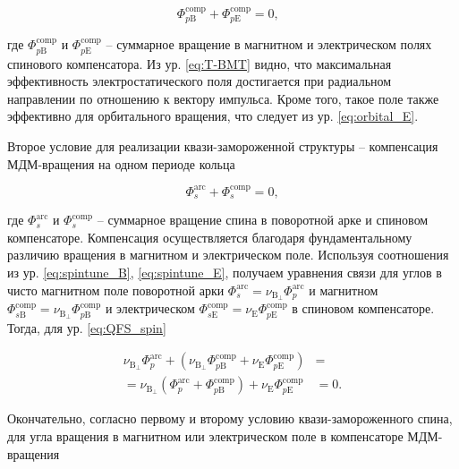 \begin{equation}
	\Phi_{p\textrm{B}}^{\textrm{comp}}+{\Phi}_{p\textrm{E}}^{\textrm{comp}} = 0,\ \ \
	\label{eq:spin_comp}
\end{equation}

\noindent где $\Phi_{p\textrm{B}}^{\textrm{comp}}$ и ${\Phi}_{p\textrm{E}}^{\textrm{comp}}$ -- суммарное вращение в магнитном и электрическом полях спинового компенсатора. Из ур. \ref{eq:T-BMT} видно, что максимальная эффективность электростатического поля достигается при радиальном направлении по отношению к вектору импульса. Кроме того, такое поле также эффективно для орбитального вращения, что следует из ур. \ref{eq:orbital_E}.

Второе условие для реализации квази-замороженной структуры -- компенсация МДМ-вращения на одном периоде кольца

\begin{equation}
	\Phi_s^{\textrm{arc}}+\Phi_{s}^{\textrm{comp}}=0,
	\label{eq:QFS_spin}
\end{equation}

\noindent где $\Phi_s^{\textrm{arc}}$ и $\Phi_{s}^{\textrm{comp}}$ -- суммарное вращение спина в поворотной арке и спиновом компенсаторе. Компенсация осуществляется благодаря фундаментальному различию вращения в магнитном и электрическом поле. Используя соотношения из ур. \ref{eq:spintune_B}, \ref{eq:spintune_E}, получаем уравнения связи для углов в чисто магнитном поле поворотной арки  $\Phi_{s}^{\text{arc}} = \nu_{\mathrm{B}_{\perp}}\Phi_{p}^{\text{arc}}$ и магнитном $\Phi_{s\mathrm{B}}^{\text{comp}} = \nu_{\mathrm{B}_{\perp}}\Phi_{p\mathrm{B}}^{\text{comp}}$ и электрическом $\Phi_{s\mathrm{E}}^{\text{comp}} = \nu_{\mathrm{E}}\Phi_{p\mathrm{E}}^{\text{comp}}$ в спиновом компенсаторе. Тогда, для ур. \ref{eq:QFS_spin}

 \begin{equation}
	\begin{aligned}
		\nu_{\mathrm{B}_{\perp}}\Phi_{p}^{\text{arc}} +
		\left(\nu_{\mathrm{B}_{\perp}}\Phi_{p\mathrm{B}}^{\text{comp}} +
		\nu_{\mathrm{E}}\Phi_{p\mathrm{E}}^{\text{comp}} \right) & = \\
		= \nu_{\mathrm{B}_{\perp}} \left( 
		\Phi_{p}^{\text{arc}} +
		\Phi_{p\mathrm{B}}^{\text{comp}} \right) +
		\nu_{\mathrm{E}}\Phi_{p\mathrm{E}}^{\text{comp}}  & = 0.
		\label{eq:deflection}
	\end{aligned}
\end{equation}

\noindent Окончательно, согласно первому и второму условию квази-замороженного спина, для угла вращения в магнитном или электрическом поле в компенсаторе МДМ-вращения

